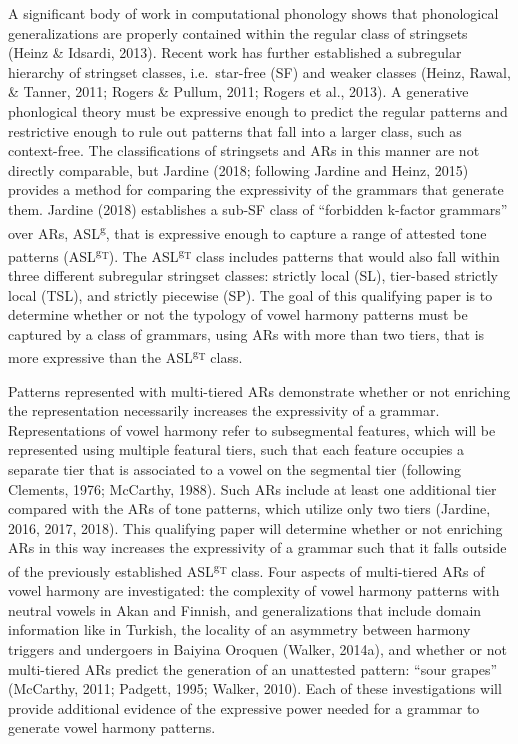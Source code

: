 \documentclass[,doc,floatsintext]{apa6}
\theoremstyle{definition}
\theoremstyle{definition}
\theoremstyle{definition}
\theoremstyle{remark}
\begin{document}
A significant body of work in computational phonology shows that
phonological generalizations are properly contained within the regular
class of stringsets (Heinz \& Idsardi, 2013). Recent work has further
established a subregular hierarchy of stringset classes, i.e.~star-free
(SF) and weaker classes (Heinz, Rawal, \& Tanner, 2011; Rogers \&
Pullum, 2011; Rogers et al., 2013). A generative phonlogical theory must
be expressive enough to predict the regular patterns and restrictive
enough to rule out patterns that fall into a larger class, such as
context-free. The classifications of stringsets and ARs in this manner
are not directly comparable, but Jardine (2018; following Jardine and
Heinz, 2015) provides a method for comparing the expressivity of the
grammars that generate them. Jardine (2018) establishes a sub-SF class
of \enquote{forbidden k-factor grammars} over ARs,
ASL\textsuperscript{g}, that is expressive enough to capture a range of
attested tone patterns (ASL\textsuperscript{g\textsubscript{T}}). The
ASL\textsuperscript{g\textsubscript{T}} class includes patterns that
would also fall within three different subregular stringset classes:
strictly local (SL), tier-based strictly local (TSL), and strictly
piecewise (SP). The goal of this qualifying paper is to determine
whether or not the typology of vowel harmony patterns must be captured
by a class of grammars, using ARs with more than two tiers, that is more
expressive than the ASL\textsuperscript{g\textsubscript{T}} class.

Patterns represented with multi-tiered ARs demonstrate whether or not
enriching the representation necessarily increases the expressivity of a
grammar. Representations of vowel harmony refer to subsegmental
features, which will be represented using multiple featural tiers, such
that each feature occupies a separate tier that is associated to a vowel
on the segmental tier (following Clements, 1976; McCarthy, 1988). Such
ARs include at least one additional tier compared with the ARs of tone
patterns, which utilize only two tiers (Jardine, 2016, 2017, 2018). This
qualifying paper will determine whether or not enriching ARs in this way
increases the expressivity of a grammar such that it falls outside of
the previously established ASL\textsuperscript{g\textsubscript{T}}
class. Four aspects of multi-tiered ARs of vowel harmony are
investigated: the complexity of vowel harmony patterns with neutral
vowels in Akan and Finnish, and generalizations that include domain
information like in Turkish, the locality of an asymmetry between
harmony triggers and undergoers in Baiyina Oroquen (Walker, 2014a), and
whether or not multi-tiered ARs predict the generation of an unattested
pattern: \enquote{sour grapes} (McCarthy, 2011; Padgett, 1995; Walker,
2010). Each of these investigations will provide additional evidence of
the expressive power needed for a grammar to generate vowel harmony
patterns.
\end{document}
